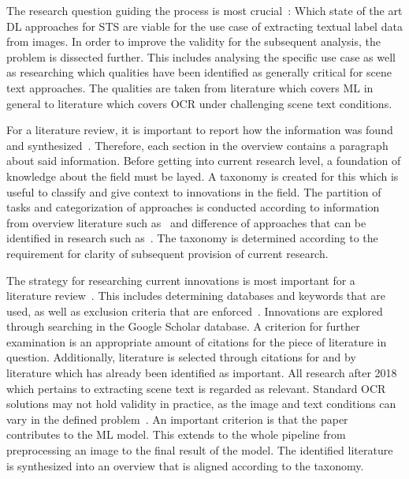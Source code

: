 The research question guiding the process is most crucial~\citep{snyder_literature_2019}:
Which state of the art \ac{DL} approaches for \ac{STS} are viable for the use case of extracting
textual label data from images.
In order to improve the validity for the subsequent analysis, the problem is dissected further.
This includes analysing the specific use case as well as researching which qualities have been
identified as generally critical for scene text approaches.
The qualities are taken from literature which covers \ac{ML} in general to literature
which covers \ac{OCR} under challenging scene text conditions.

For a literature review, it is important to report how the information was found and
synthesized~\citep{torraco_writing_2005}.
Therefore, each section in the overview contains a paragraph about said information.
Before getting into current research level, a foundation of knowledge about the field must be layed.
A taxonomy is created for this which is useful to classify and give context to innovations in the
field.
The partition of tasks and categorization of approaches is conducted according to information from
overview literature such as~\cite{long_scene_2021,chen_text_2021,cong_comparative_2019} and
difference of approaches that can be identified in research such
as~\cite{qiao_text_2021,sheng_centripetaltext_2021,liu_accurate_2020,deng_pixellink_2018}.
The taxonomy is determined according to the requirement for clarity of subsequent provision of
current research.

The strategy for researching current innovations is most important for a literature
review~\citep{snyder_literature_2019}.
This includes determining databases and keywords that are used, as well as exclusion criteria
that are enforced~\citep{torraco_writing_2005}.
Innovations are explored through searching in the Google Scholar database.
A criterion for further examination is an appropriate amount of citations for the piece of literature
in question.
Additionally, literature is selected through citations for and by literature which has already been
identified as important.
All research after 2018 which pertains to extracting scene text is regarded as relevant.
Standard \ac{OCR} solutions may not hold validity in practice, as the image and text conditions can
vary in the defined problem~\citep{chen_text_2021}.
An important criterion is that the paper contributes to the \ac{ML} model.
This extends to the whole pipeline from preprocessing an image to the final result of the model.
The identified literature is synthesized into an overview that is aligned according to the taxonomy.

